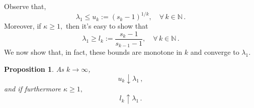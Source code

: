 \documentclass[11pt]{article}
\newtheorem{proposition}[theorem]{Proposition}
\begin{document}
	Observe that,
	\begin{equation*} \lambda_1 \leq u_k := (s_k-1)^{1/k},\quad
          \forall \, k \in \mathbb{N} \,.
	\end{equation*}
	Moreover, if $\kappa \geq 1,$ then it's easy to show that
	\begin{equation*} \lambda_1 \geq l_k :=
          \frac{s_k-1}{s_{k-1}-1}, \quad \forall \, k \in \mathbb{N}
          \,.
	\end{equation*}
	We now show that, in fact, these bounds are monotone in $k$
        and converge to $\lambda_1$.
	
	\begin{proposition} \label{eigenlim}
		As $k \to \infty$,
		\begin{equation} \label{uklim}
		u_k \downarrow \lambda_1 \,,
		\end{equation}
		and if furthermore $\kappa \geq 1,$
		\begin{equation} \label{lklim}
		l_k \uparrow \lambda_1 \,.
		\end{equation}
	\end{proposition}
\end{document}
